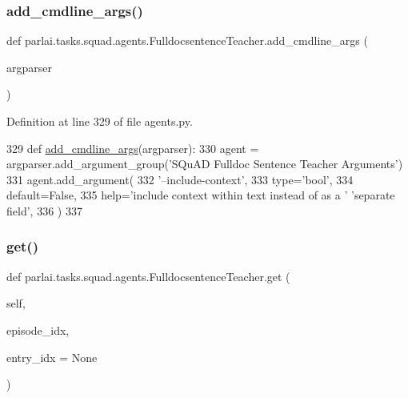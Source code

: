 \subsubsection{\texorpdfstring{add\+\_\+cmdline\+\_\+args()}{add\_cmdline\_args()}}
{\footnotesize\ttfamily def parlai.\+tasks.\+squad.\+agents.\+Fulldocsentence\+Teacher.\+add\+\_\+cmdline\+\_\+args (\begin{DoxyParamCaption}\item[{}]{argparser }\end{DoxyParamCaption})\hspace{0.3cm}{\ttfamily [static]}}



Definition at line 329 of file agents.\+py.


\begin{DoxyCode}
329     \textcolor{keyword}{def }\hyperlink{namespaceparlai_1_1agents_1_1drqa_1_1config_a62fdd5554f1da6be0cba185271058320}{add\_cmdline\_args}(argparser):
330         agent = argparser.add\_argument\_group(\textcolor{stringliteral}{'SQuAD Fulldoc Sentence Teacher Arguments'})
331         agent.add\_argument(
332             \textcolor{stringliteral}{'--include-context'},
333             type=\textcolor{stringliteral}{'bool'},
334             default=\textcolor{keyword}{False},
335             help=\textcolor{stringliteral}{'include context within text instead of as a '} \textcolor{stringliteral}{'separate field'},
336         )
337 
\end{DoxyCode}
\mbox{\label{classparlai_1_1tasks_1_1squad_1_1agents_1_1FulldocsentenceTeacher_a60f31f40d228baf2a27eb4e1e2e1c213}} 
\subsubsection{\texorpdfstring{get()}{get()}}
{\footnotesize\ttfamily def parlai.\+tasks.\+squad.\+agents.\+Fulldocsentence\+Teacher.\+get (\begin{DoxyParamCaption}\item[{}]{self,  }\item[{}]{episode\+\_\+idx,  }\item[{}]{entry\+\_\+idx = {\ttfamily None} }\end{DoxyParamCaption})}



